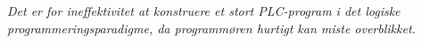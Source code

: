 \noindent \textit{Det er for ineffektivitet at konstruere et stort PLC-program i det logiske programmeringsparadigme, da programmøren hurtigt kan miste overblikket.}








